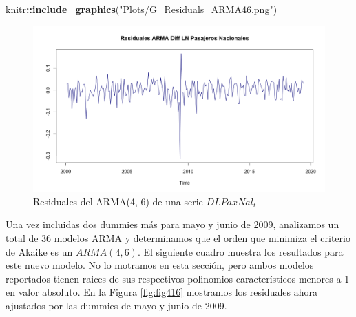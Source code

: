 \documentclass[
]{book}
\newenvironment{Shaded}{\begin{snugshade}}{\end{snugshade}}
\newcommand{\FunctionTok}[1]{\textcolor[rgb]{0.13,0.29,0.53}{\textbf{#1}}}
\newcommand{\NormalTok}[1]{#1}
\newcommand{\SpecialCharTok}[1]{\textcolor[rgb]{0.81,0.36,0.00}{\textbf{#1}}}
\newcommand{\StringTok}[1]{\textcolor[rgb]{0.31,0.60,0.02}{#1}}
\begin{document}
\begin{Shaded}
\begin{Highlighting}[]
\NormalTok{knitr}\SpecialCharTok{::}\FunctionTok{include\_graphics}\NormalTok{(}\StringTok{"Plots/G\_Residuals\_ARMA46.png"}\NormalTok{) }
\end{Highlighting}
\end{Shaded}

\begin{figure}

{\centering \includegraphics[width=0.95\linewidth]{Plots/G_Residuals_ARMA46} 

}

\caption{Residuales del ARMA(4, 6) de una serie $DLPaxNal_t$}\label{fig:fig415}
\end{figure}

Una vez incluidas dos dummies más para mayo y junio de 2009, analizamos un total de 36 modelos ARMA y determinamos que el orden que minimiza el criterio de Akaike es un \(ARMA(4, 6)\). El siguiente cuadro muestra los resultados para este nuevo modelo. No lo motramos en esta sección, pero ambos modelos reportados tienen raices de sus respectivos polinomios característicos menores a 1 en valor absoluto. En la Figura \ref{fig:fig416} mostramos los residuales ahora ajustados por las dummies de mayo y junio de 2009.
\end{document}
